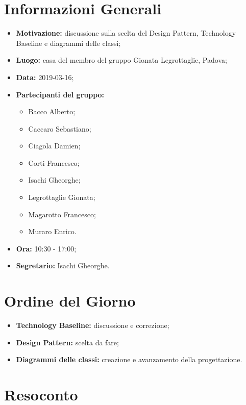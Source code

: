 \documentclass[a4paper, oneside, openany, dvipsnames, table]{article}
\begin{document}
\copertina{}


\newpage
\tableofcontents
\newpage
\section{Informazioni Generali}
\begin{itemize}
\item \textbf{Motivazione:} discussione sulla scelta del Design Pattern, Technology Baseline e diagrammi delle classi;
\item \textbf{Luogo:} casa del membro del gruppo Gionata Legrottaglie, Padova;
\item \textbf{Data:} 2019-03-16;
\item \textbf{Partecipanti del gruppo:} \hfill
	\begin{itemize}
	\item Bacco Alberto;
	\item Caccaro Sebastiano;
	\item Ciagola Damien;
	\item Corti Francesco;
	\item Isachi Gheorghe;
	\item Legrottaglie Gionata;
	\item Magarotto Francesco;
	\item Muraro Enrico.
	\end{itemize} 
\item \textbf{Ora:} 10:30 - 17:00;
\item \textbf{Segretario:} Isachi Gheorghe.
\end{itemize}

\section{Ordine del Giorno}
\begin{itemize}
\item \textbf{Technology Baseline:} discussione e correzione;
\item \textbf{Design Pattern:} scelta da fare; 
\item \textbf{Diagrammi delle classi:} creazione e avanzamento della progettazione.
\end{itemize}

\section{Resoconto}
\end{document}
